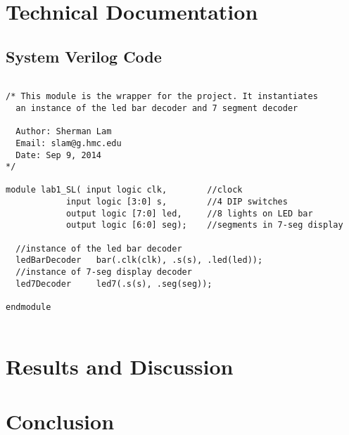 \documentclass[11pt]{article}
\begin{document}
\section{Technical Documentation}



\subsection{System Verilog Code}

\small\begin{verbatim}

/* This module is the wrapper for the project. It instantiates
  an instance of the led bar decoder and 7 segment decoder
  
  Author: Sherman Lam
  Email: slam@g.hmc.edu
  Date: Sep 9, 2014
*/

module lab1_SL( input logic clk,        //clock
            input logic [3:0] s,        //4 DIP switches
            output logic [7:0] led,     //8 lights on LED bar
            output logic [6:0] seg);    //segments in 7-seg display
  
  //instance of the led bar decoder
  ledBarDecoder   bar(.clk(clk), .s(s), .led(led));   
  //instance of 7-seg display decoder
  led7Decoder     led7(.s(s), .seg(seg)); 

endmodule


\end{verbatim}




\clearpage

\section{Results and Discussion}




\section{Conclusion}
\end{document}

